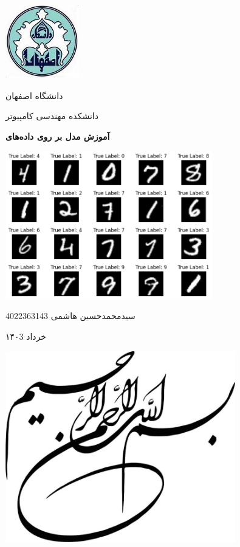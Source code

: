 \documentclass[12pt, dvipsnames, svgnames, x11names,]{article}
\begin{document}
	\begin{titlepage}
		\centering
		
		\centering
		\includegraphics[width=3.2cm, height=3.2cm]{images/image001}\par
		\vspace{5mm}
		{\large دانشگاه اصفهان}\par
		\vspace{5mm}
		{\large دانشکده مهندسی کامپیوتر}\par
		
		\vspace{1cm}
		{\Large {\textbf{آموزش مدل  بر روی داده‌های }}\par}
		\vspace{15mm}
		\includegraphics[width=9cm]{images/00.png} \par
		\vfill \par	\vfill
		\vspace{16mm}
		{\normalsize	سیدمحمدحسین هاشمی  4022363143 \par}
		\vspace{1cm}
		{\large خرداد ۱۴۰3\par}
	\end{titlepage}
	
	\clearpage
	\begin{center}
		\includegraphics[width=10cm]{images/image002}
	\end{center}  
	\thispagestyle{plain}\mbox{} 
	\clearpage
\end{document}
